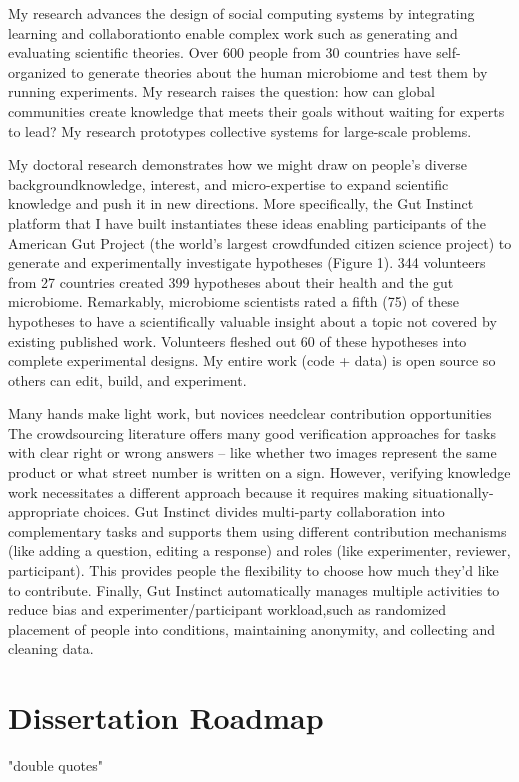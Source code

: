 My research advances the design of social computing systems by integrating learning and collaborationto enable complex work such as generating and evaluating scientific theories. Over 600 people from 30 countries have self-organized to generate theories about the human microbiome and test them by running experiments. My research raises the question: how can global communities create knowledge that meets their goals without waiting for experts to lead? My research prototypes collective systems for large-scale problems.

My doctoral research demonstrates how we might draw on people’s diverse backgroundknowledge, interest, and micro-expertise to expand scientific knowledge and push it in new directions. More specifically, the Gut Instinct platform that I have built instantiates these ideas enabling participants of the American Gut Project (the world’s largest crowdfunded citizen science project) to generate and experimentally investigate hypotheses (Figure 1). 344 volunteers from 27 countries created 399 hypotheses about their health and the gut microbiome. Remarkably, microbiome scientists rated a fifth (75) of these hypotheses to have a scientifically valuable insight about a topic not covered by existing published work. Volunteers fleshed out 60 of these hypotheses into complete experimental designs. My entire work (code + data) is open source so others can edit, build, and experiment.

Many hands make light work, but novices needclear contribution opportunities The crowdsourcing literature offers many good verification approaches for tasks with clear right or wrong answers – like whether two images represent the same product or what street number is written on a sign. However, verifying knowledge work necessitates a different approach because it requires making situationally-appropriate choices. Gut Instinct divides multi-party collaboration into complementary tasks and supports them using different contribution mechanisms (like adding a question, editing a response) and roles (like experimenter, reviewer, participant). This provides people the flexibility to choose how much they’d like to contribute. Finally, Gut Instinct automatically manages multiple activities to reduce bias and experimenter/participant workload,such as randomized placement of people into conditions, maintaining anonymity, and collecting and cleaning data.


\section{Dissertation Roadmap}



"double quotes"

